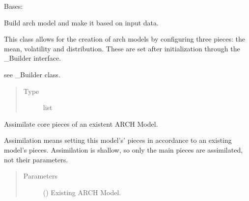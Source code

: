 \documentclass[letterpaper,10pt,english]{sphinxmanual}
\begin{document}
\begin{fulllineitems}
\label{\detokenize{dalio.pipe:dalio.pipe.builders.MakeARCH}}
Bases: {\hyperref[\detokenize{dalio.pipe:dalio.pipe.pipe.PipeBuilder}]{}}

Build arch model and make it based on input data.

This class allows for the creation of arch models by configuring three
pieces: the mean, volatility and distribution. These are set after
initialization through the \_Builder interface.

\begin{fulllineitems}
\label{\detokenize{dalio.pipe:dalio.pipe.builders.MakeARCH._piece}}
see \_Builder class.
\begin{quote}\begin{description}
\item[{Type}] \leavevmode
list

\end{description}\end{quote}

\end{fulllineitems}


\begin{fulllineitems}
\label{\detokenize{dalio.pipe:dalio.pipe.builders.MakeARCH.assimilate}}
Assimilate core pieces of an existent ARCH Model.

Assimilation means setting this model’s’ pieces in accordance to an
existing model’s pieces. Assimilation is shallow, so only the main
pieces are assimilated, not their parameters.
\begin{quote}\begin{description}
\item[{Parameters}] \leavevmode
{} () \textendash{} Existing ARCH Model.


\end{description}
\end{quote}
\end{fulllineitems}
\end{fulllineitems}
\end{document}
